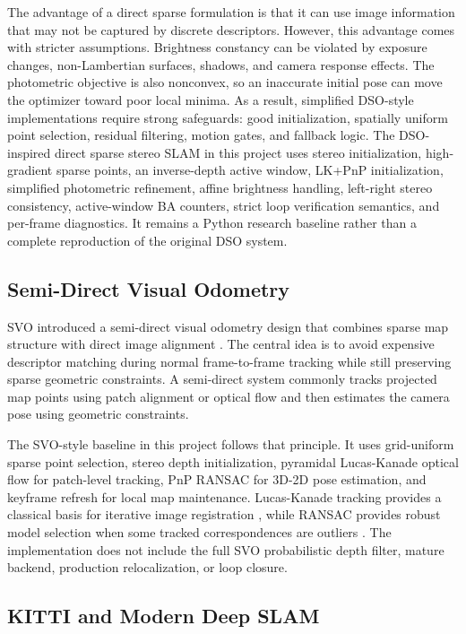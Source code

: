 \documentclass[11pt,a4paper]{article}
\newcommand{\methoddso}{DSO-inspired direct sparse stereo SLAM}
\begin{document}
The advantage of a direct sparse formulation is that it can use image information that may not be captured by discrete descriptors. However, this advantage comes with stricter assumptions. Brightness constancy can be violated by exposure changes, non-Lambertian surfaces, shadows, and camera response effects. The photometric objective is also nonconvex, so an inaccurate initial pose can move the optimizer toward poor local minima. As a result, simplified DSO-style implementations require strong safeguards: good initialization, spatially uniform point selection, residual filtering, motion gates, and fallback logic. The \methoddso{} in this project uses stereo initialization, high-gradient sparse points, an inverse-depth active window, LK+PnP initialization, simplified photometric refinement, affine brightness handling, left-right stereo consistency, active-window BA counters, strict loop verification semantics, and per-frame diagnostics. It remains a Python research baseline rather than a complete reproduction of the original DSO system.

\subsection{Semi-Direct Visual Odometry}

SVO introduced a semi-direct visual odometry design that combines sparse map structure with direct image alignment \cite{forster2014svo}. The central idea is to avoid expensive descriptor matching during normal frame-to-frame tracking while still preserving sparse geometric constraints. A semi-direct system commonly tracks projected map points using patch alignment or optical flow and then estimates the camera pose using geometric constraints.

The SVO-style baseline in this project follows that principle. It uses grid-uniform sparse point selection, stereo depth initialization, pyramidal Lucas-Kanade optical flow for patch-level tracking, PnP RANSAC for 3D-2D pose estimation, and keyframe refresh for local map maintenance. Lucas-Kanade tracking provides a classical basis for iterative image registration \cite{lucas1981iterative}, while RANSAC provides robust model selection when some tracked correspondences are outliers \cite{fischler1981random}. The implementation does not include the full SVO probabilistic depth filter, mature backend, production relocalization, or loop closure.

\subsection{KITTI and Modern Deep SLAM}
\end{document}
